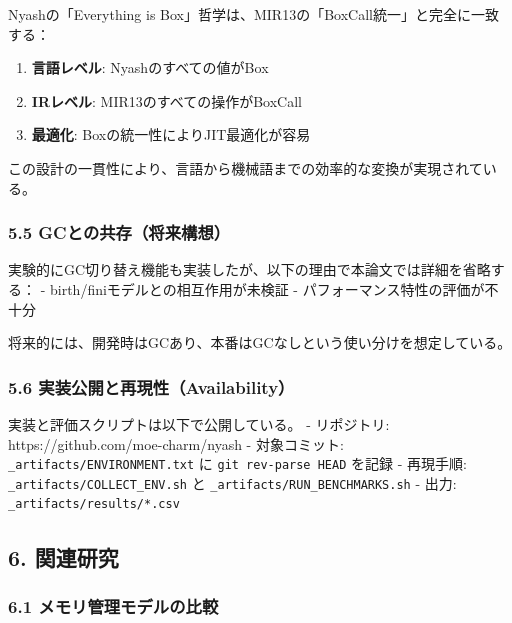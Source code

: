 \documentclass[
]{article}
\providecommand{\tightlist}{%
  \setlength{\itemsep}{0pt}\setlength{\parskip}{0pt}}
\begin{document}
Nyashの「Everything is
Box」哲学は、MIR13の「BoxCall統一」と完全に一致する：

\begin{enumerate}
\def\labelenumi{\arabic{enumi}.}
\tightlist
\item
  \textbf{言語レベル}: Nyashのすべての値がBox
\item
  \textbf{IRレベル}: MIR13のすべての操作がBoxCall
\item
  \textbf{最適化}: Boxの統一性によりJIT最適化が容易
\end{enumerate}

この設計の一貫性により、言語から機械語までの効率的な変換が実現されている。

\hypertarget{gcux3068ux306eux5171ux5b58ux5c06ux6765ux69cbux60f3}{%
\subsubsection{5.5
GCとの共存（将来構想）}\label{gcux3068ux306eux5171ux5b58ux5c06ux6765ux69cbux60f3}}

実験的にGC切り替え機能も実装したが、以下の理由で本論文では詳細を省略する：
- birth/finiモデルとの相互作用が未検証 -
パフォーマンス特性の評価が不十分

将来的には、開発時はGCあり、本番はGCなしという使い分けを想定している。

\hypertarget{ux5b9fux88c5ux516cux958bux3068ux518dux73feux6027availability}{%
\subsubsection{5.6
実装公開と再現性（Availability）}\label{ux5b9fux88c5ux516cux958bux3068ux518dux73feux6027availability}}

実装と評価スクリプトは以下で公開している。 - リポジトリ:
https://github.com/moe-charm/nyash - 対象コミット:
\texttt{\_artifacts/ENVIRONMENT.txt} に \texttt{git\ rev-parse\ HEAD}
を記録 - 再現手順: \texttt{\_artifacts/COLLECT\_ENV.sh} と
\texttt{\_artifacts/RUN\_BENCHMARKS.sh} - 出力:
\texttt{\_artifacts/results/*.csv}

\hypertarget{ux95a2ux9023ux7814ux7a76}{%
\subsection{6. 関連研究}\label{ux95a2ux9023ux7814ux7a76}}

\hypertarget{ux30e1ux30e2ux30eaux7ba1ux7406ux30e2ux30c7ux30ebux306eux6bd4ux8f03}{%
\subsubsection{6.1
メモリ管理モデルの比較}\label{ux30e1ux30e2ux30eaux7ba1ux7406ux30e2ux30c7ux30ebux306eux6bd4ux8f03}}
\end{document}
